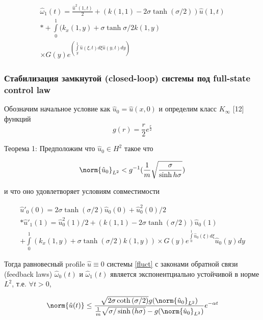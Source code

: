 \begin{gather}
  \hat{\omega}_1(t) = \frac{\hat{u}^2(1, t)}{2} + (k(1, 1) - 2\sigma\tanh{(\sigma/2)})\hat{u}(1, t) \\* + 
  \int\limits_0^1{(k_x(1, y) + \sigma\tanh{\sigma/2}k(1, y)} \\ \nonumber 
  \times G(y)e^{(\int\limits_y^1{\hat{u}(\xi, t)d\xi}\hat{u}(y, t) dy)} \nonumber
\end{gather}

\subsubsection{Стабилизация замкнутой (closed-loop) системы под full-state control law}

Обозначим начальное условие как $\hat{u}_0 = \hat{u}(x, 0)$ и определим класс $K_{\infty}$ [12] функций
\begin{equation}
  g(r) = \frac{r}{2}e^{\frac{r}{2}}
\end{equation}

Теорема 1: Предположим что $\hat{u}_0 \in H^2$ такое что 

\begin{equation}
  \norm{\hat{u}_0}_{L^2} < g^{-1}(\frac{1}{m}\sqrt{\frac{\sigma}{\sinh{h\sigma}}})
\end{equation}

и что оно удовлетворяет условиям совместимости


\begin{gather}
  \hat{u}'_0(0) = 2\sigma\tanh({\sigma/2})\hat{u}_0(0) + \hat{u}^2_0(0)/2\\*
  \hat{u}'_1(1) = \hat{u}^2_0(1)/2 + (k(1, 1) - 2\sigma\tanh{(\sigma/2)}) \hat{u}_0(1) \\ \nonumber
  + \int\limits_0^1{(k_x(1, y) + \sigma\tanh{(\sigma/2)}k(1, y)) \times G(y)e^{\int\limits_0^1{\hat{u}_0(\xi)d\xi}}\hat{u}_0(y)dy}
\end{gather}

Тогда равновесный profile $\hat{u} \equiv 0$ системы \eqref{fluct} с законами обратной связи (feedback laws) $\hat{\omega}_0(t)$ и $\hat{\omega}_1(t)$ является экспонентциально устойчивой в норме $L^2$, т.е. $\forall t > 0$,

\begin{equation}
  \norm{\hat{u}(t)} \le \frac{\sqrt{2\sigma\coth{(\sigma/2)}}g(\norm{\hat{u}_0}_{L^2})}{\frac{1}{m}\sqrt{\sigma/\sinh{(h\sigma)}} - g(\norm{\hat{u}_0}_{L^2})}e^{-\alpha t}   
\end{equation} 

